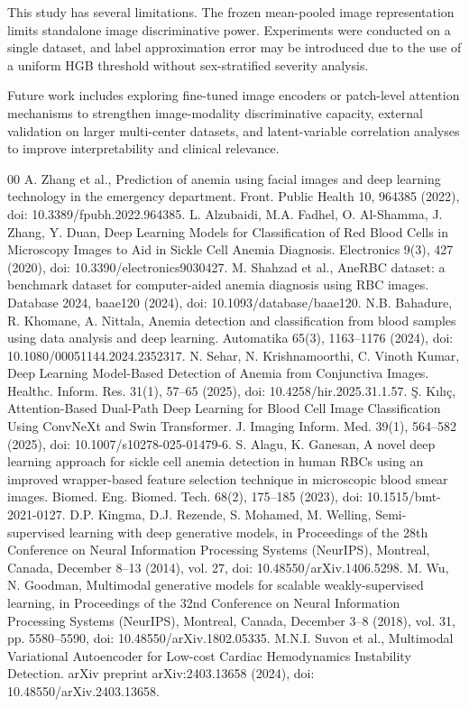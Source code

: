 \documentclass[conference]{IEEEtran}
\begin{document}
This study has several limitations. The frozen mean-pooled image representation limits standalone image discriminative power. Experiments were conducted on a single dataset, and label approximation error may be introduced due to the use of a uniform HGB threshold without sex-stratified severity analysis.

Future work includes exploring fine-tuned image encoders or patch-level attention mechanisms to strengthen image-modality discriminative capacity, external validation on larger multi-center datasets, and latent-variable correlation analyses to improve interpretability and clinical relevance.


\FloatBarrier
\begin{thebibliography}{00}
 A. Zhang et al., Prediction of anemia using facial images and deep learning technology in the emergency department. Front. Public Health 10, 964385 (2022), doi: 10.3389/fpubh.2022.964385.
 L. Alzubaidi, M.A. Fadhel, O. Al-Shamma, J. Zhang, Y. Duan, Deep Learning Models for Classification of Red Blood Cells in Microscopy Images to Aid in Sickle Cell Anemia Diagnosis. Electronics 9(3), 427 (2020), doi: 10.3390/electronics9030427.
 M. Shahzad et al., AneRBC dataset: a benchmark dataset for computer-aided anemia diagnosis using RBC images. Database 2024, baae120 (2024), doi: 10.1093/database/baae120.
 N.B. Bahadure, R. Khomane, A. Nittala, Anemia detection and classification from blood samples using data analysis and deep learning. Automatika 65(3), 1163--1176 (2024), doi: 10.1080/00051144.2024.2352317.
 N. Sehar, N. Krishnamoorthi, C. Vinoth Kumar, Deep Learning Model-Based Detection of Anemia from Conjunctiva Images. Healthc. Inform. Res. 31(1), 57--65 (2025), doi: 10.4258/hir.2025.31.1.57.
 \c{S}. K{\i}l{\i}\c{c}, Attention-Based Dual-Path Deep Learning for Blood Cell Image Classification Using ConvNeXt and Swin Transformer. J. Imaging Inform. Med. 39(1), 564--582 (2025), doi: 10.1007/s10278-025-01479-6.
 S. Alagu, K. Ganesan, A novel deep learning approach for sickle cell anemia detection in human RBCs using an improved wrapper-based feature selection technique in microscopic blood smear images. Biomed. Eng. Biomed. Tech. 68(2), 175--185 (2023), doi: 10.1515/bmt-2021-0127.
 D.P. Kingma, D.J. Rezende, S. Mohamed, M. Welling, Semi-supervised learning with deep generative models, in Proceedings of the 28th Conference on Neural Information Processing Systems (NeurIPS), Montreal, Canada, December 8--13 (2014), vol. 27, doi: 10.48550/arXiv.1406.5298.
 M. Wu, N. Goodman, Multimodal generative models for scalable weakly-supervised learning, in Proceedings of the 32nd Conference on Neural Information Processing Systems (NeurIPS), Montreal, Canada, December 3--8 (2018), vol. 31, pp. 5580--5590, doi: 10.48550/arXiv.1802.05335.
 M.N.I. Suvon et al., Multimodal Variational Autoencoder for Low-cost Cardiac Hemodynamics Instability Detection. arXiv preprint arXiv:2403.13658 (2024), doi: 10.48550/arXiv.2403.13658.
\end{thebibliography}
\end{document}

